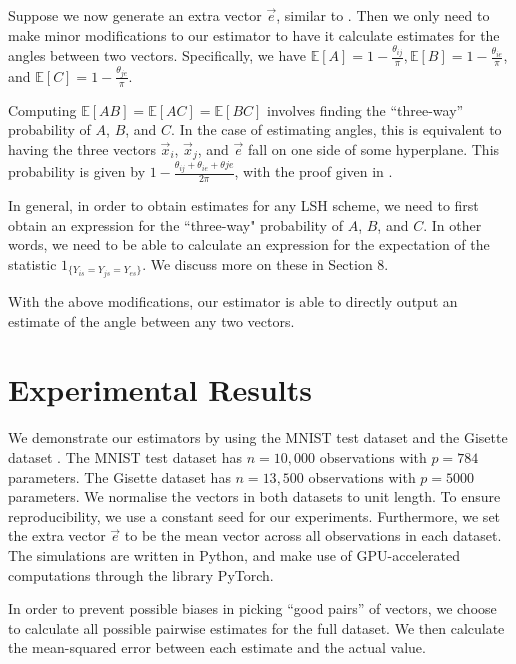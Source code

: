 \documentclass[runningheads]{llncs}
\newcommand{\e}{\mathbb{E}}
\begin{document}
        
Suppose we now generate an extra vector $\vec{e}$, similar to \cite{kang2018improving}. Then we only need to make minor modifications to our estimator to have it calculate estimates for the angles between two vectors. Specifically, we have $\e[A] = 1 - \frac{\theta_{ij}}{\pi}, \e[B] = 1 - \frac{\theta_{ie}}{\pi}$, and $ \e[C] = 1 - \frac{\theta_{je}}{\pi}$.
       
        
Computing $\e[AB] = \e[AC] = \e[BC]$ involves finding the ``three-way'' probability of $A$, $B$, and $C$. In the case of estimating angles, this is equivalent to having the three vectors $\vec{x}_i$, $\vec{x}_j$, and $\vec{e}$ fall on one side of some hyperplane. This probability is given by $1 - \frac{\theta_{ij} + \theta_{ie} + \theta{je}}{2\pi}$, with the proof given in \cite{kang2018improving}.

In general, in order to obtain estimates for any LSH scheme, we need to first obtain an expression for the ``three-way" probability of $A$, $B$, and $C$. In other words, we need to be able to calculate an expression for the expectation of the statistic $1_{\{Y_{is} = Y_{js} = Y_{es}\}}$. We discuss more on these in Section 8.

With the above modifications, our estimator is able to directly output an estimate of the angle between any two vectors.
        
        
\section{Experimental Results}

    We demonstrate our estimators by using the MNIST test dataset \cite{lecun1998gradient} and the Gisette dataset \cite{guyon2004result,Lichman:2013}. The MNIST test dataset has $n = 10,000$ observations with $p=784$ parameters. The Gisette dataset has $n=13,500$ observations with $p=5000$ parameters. We normalise the vectors in both datasets to unit length. To ensure reproducibility, we use a constant seed for our experiments. Furthermore, we set the extra vector $\vec{e}$ to be the mean vector across all observations in each dataset. The simulations are written in Python, and make use of GPU-accelerated computations through the library PyTorch. %
    
    In order to prevent possible biases in picking ``good pairs'' of vectors, we choose to calculate all possible pairwise estimates for the full dataset. We then calculate the mean-squared error between each estimate and the actual value.
    
\end{document}
